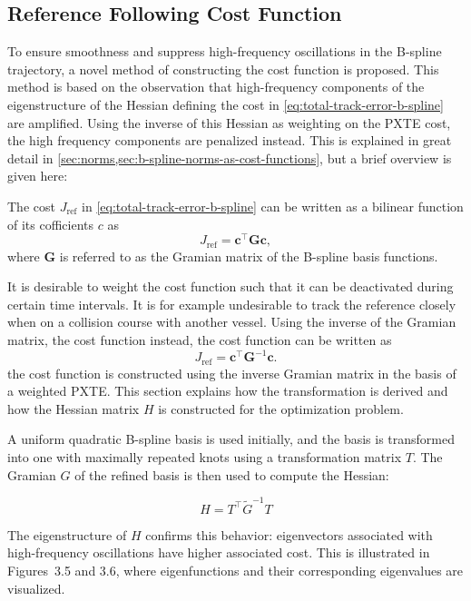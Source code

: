 \subsection{Reference Following Cost Function}\label{sec:oscillations}
To ensure smoothness and suppress high-frequency oscillations in the B-spline trajectory, a novel method of constructing the cost function is proposed. This method is based on the observation that high-frequency components of the eigenstructure of the Hessian defining the cost in \cref{eq:total-track-error-b-spline} are amplified. Using the inverse of this Hessian as weighting on the PXTE cost, the high frequency components are penalized instead. This is explained in great detail in \cref{sec:norms,sec:b-spline-norms-as-cost-functions}, but a brief overview is given here:

The cost $J_\text{ref}$ in \cref{eq:total-track-error-b-spline} can be written as a bilinear function of its cofficients $c$ as
\begin{equation}\label{eq:cost-reference-following-bilinear}
    J_\text{ref} = \mathbf c^\top \mathbf G \mathbf c,
\end{equation}
where $\mathbf G$ is referred to as the Gramian matrix of the B-spline basis functions. 

It is desirable to weight the cost function such that it can be deactivated during certain time intervals. It is for example undesirable to track the reference closely when on a collision course with another vessel.
Using the inverse of the Gramian matrix, the cost function instead, the cost function can be written as
\begin{equation}\label{eq:cost-reference-following-inverse-gramian}
    J_\text{ref} = \mathbf c^\top \mathbf G^{-1} \mathbf c.
\end{equation}
the cost function is constructed using the inverse Gramian matrix in the basis of a weighted PXTE. This section explains how the transformation is derived and how the Hessian matrix \( H \) is constructed for the optimization problem.

A uniform quadratic B-spline basis is used initially, and the basis is transformed into one with maximally repeated knots using a transformation matrix \( T \). The Gramian \( G \) of the refined basis is then used to compute the Hessian:

\[
H = T^\top \tilde{G}^{-1} T
\]

The eigenstructure of \( H \) confirms this behavior: eigenvectors associated with high-frequency oscillations have higher associated cost. This is illustrated in Figures~3.5 and 3.6, where eigenfunctions and their corresponding eigenvalues are visualized.





